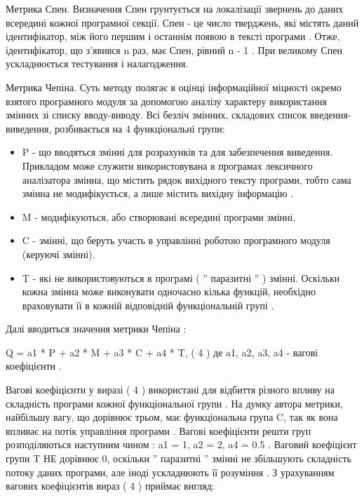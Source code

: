 Метрика Спен.
Визначення Спен грунтується на локалізації звернень до даних всередині кожної програмної секції. Спен - це число тверджень, які містять даний ідентифікатор, між його першим і останнім появою в тексті програми . Отже, ідентифікатор, що з'явився n раз, має Спен, рівний n - 1 . При великому Спен ускладнюється тестування і налагодження.

Метрика Чепіна.
Суть методу полягає в оцінці інформаційної міцності окремо взятого програмного модуля за допомогою аналізу характеру використання змінних зі списку вводу-виводу.
Всі безліч змінних, складових список введення-виведення, розбивається на 4 функціональні групи:

\begin{itemize}
\item P - що вводяться змінні для розрахунків та для забезпечення виведення.
Прикладом може служити використовувана в програмах лексичного аналізатора змінна, що містить рядок вихідного тексту програми, тобто сама змінна не модифікується, а лише містить вихідну інформацію .

\item M - модифікуються, або створювані всередині програми змінні.

\item C - змінні, що беруть участь в управлінні роботою програмного модуля (керуючі змінні).

\item T - які не використовуються в програмі ( '' паразитні '' ) змінні. Оскільки кожна змінна може виконувати одночасно кілька функцій, необхідно враховувати її в кожній відповідній функціональній групі . 
\end{itemize}

Далі вводиться значення метрики Чепіна :

Q = a1 * P + a2 * M + a3 * C + a4 * T, ( 4 )
де a1, a2, a3, a4 - вагові коефіцієнти .

Вагові коефіцієнти у виразі ( 4 ) використані для відбиття різного впливу на складність програми кожної функціональної групи . На думку автора метрики, найбільшу вагу, що дорівнює трьом, має функціональна група C, так як вона впливає на потік управління програми . Вагові коефіцієнти решти груп розподіляються наступним чином : a1 = 1, a2 = 2, a4 = 0.5 . Ваговий коефіцієнт групи T НЕ дорівнює 0, оскільки '' паразитні '' змінні не збільшують складність потоку даних програми, але іноді ускладнюють її розуміння . З урахуванням вагових коефіцієнтів вираз ( 4 ) приймає вигляд:

